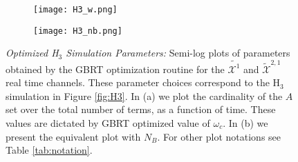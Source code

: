 \begin{figure}[h!] 
    \centering
        \begin{subfigure}[b]{.49\textwidth}
            \texttt{[image: H3\_w.png]}
            \caption{}
        \end{subfigure}
        \begin{subfigure}[b]{.49\textwidth}
            \texttt{[image: H3\_nb.png]}
            \caption{}
        \end{subfigure}
        \caption{\textit{Optimized H$_3$ Simulation Parameters:} Semi-log plots of parameters obtained by the GBRT optimization routine for the $\widetilde{\mathcal{X}^{1}}$ and $\widetilde{\mathcal{X}}^{2,1}$ real time channels. These parameter choices correspond to the H$_3$ simulation in Figure \ref{fig:H3}. In (a) we plot the cardinality of the $A$ set over the total number of terms, as a function of time. These values are dictated by GBRT optimized value of $\omega_c$. In (b) we present the equivalent plot with $N_B$. For other plot notations see Table \ref{tab:notation}.} 
        \label{fig:H3nbW}
\end{figure}
\FloatBarrier

